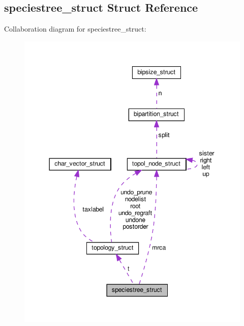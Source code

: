 \hypertarget{structspeciestree__struct}{}\subsection{speciestree\+\_\+struct Struct Reference}
\label{structspeciestree__struct}


Collaboration diagram for speciestree\+\_\+struct\+:\nopagebreak
\begin{figure}[H]
\begin{center}
\leavevmode
\includegraphics[width=344pt]{structspeciestree__struct__coll__graph}
\end{center}
\end{figure}
